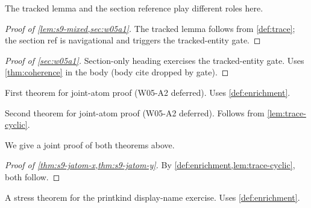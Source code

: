 \documentclass{article}
\numberwithin{equation}{section}
\begin{document}
The tracked lemma and the section reference play different roles here.

\begin{proof}[Proof of \cref{lem:s9-mixed,sec:w05a1}]
The tracked lemma follows from \cref{def:trace}; the section ref
is navigational and triggers the tracked-entity gate.
\end{proof}

\begin{proof}[Proof of \autoref{sec:w05a1}]
Section-only heading exercises the tracked-entity gate.
Uses \cref{thm:coherence} in the body (body cite dropped by gate).
\end{proof}

\begin{theorem}\label{thm:s9-jatom-x}
First theorem for joint-atom proof (W05-A2 deferred).
Uses \cref{def:enrichment}.
\end{theorem}

\begin{theorem}\label{thm:s9-jatom-y}
Second theorem for joint-atom proof (W05-A2 deferred).
Follows from \cref{lem:trace-cyclic}.
\end{theorem}

We give a joint proof of both theorems above.

\begin{proof}[Proof of \cref{thm:s9-jatom-x,thm:s9-jatom-y}]
By \cref{def:enrichment,lem:trace-cyclic}, both follow.
\end{proof}

\begin{printkindstress}\label{thm:printkindstress}
A stress theorem for the printkind display-name exercise.
Uses \cref{def:enrichment}.
\end{printkindstress}
\end{document}
